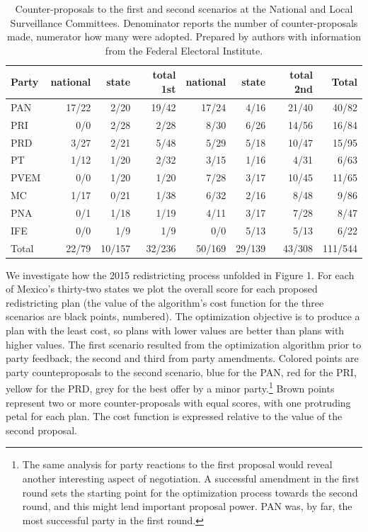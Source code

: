 \documentclass[letter,12pt]{article}
\begin{document}
\begin{table}
\begin{center}
  \begin{tabular}{lrrr|rrr|r}
    Party & national & state  & total 1st & national& state  & total 2nd & Total \\ \hline
    PAN   & 17/22    & 2/20   & 19/42     & 17/24   & 4/16   & 21/40     & 40/82 \\
    PRI   & 0/0      & 2/28   & 2/28      & 8/30    & 6/26   & 14/56     & 16/84 \\
    PRD   & 3/27     & 2/21   & 5/48      & 5/29    & 5/18   & 10/47     & 15/95 \\
    PT    & 1/12     & 1/20   & 2/32      & 3/15    & 1/16   & 4/31      & 6/63 \\
    PVEM  & 0/0      & 1/20   & 1/20      & 7/28    & 3/17   & 10/45     & 11/65 \\
    MC    & 1/17     & 0/21   & 1/38      & 6/32    & 2/16   & 8/48      & 9/86 \\
    PNA   & 0/1      & 1/18   & 1/19      & 4/11    & 3/17   & 7/28      & 8/47 \\
    IFE   & 0/0      & 1/9    & 1/9       & 0/0     & 5/13   & 5/13      & 6/22 \\ \hline
    Total & 22/79    & 10/157 & 32/236    & 50/169  & 29/139 & 43/308    & 111/544 \\
  \end{tabular}
  \caption{Counter-proposals to the first and second scenarios at the National and Local Surveillance Committees. Denominator reports the number of counter-proposals made, numerator how many were adopted. Prepared by authors with information from the Federal Electoral Institute.}\label{T:counterprops}
\end{center}
\end{table}

We investigate how the 2015 redistricting process unfolded in Figure 1. For each of Mexico's thirty-two states we plot the overall score for each proposed redistricting plan (the value of the algorithm's cost function for the three scenarios are black points, numbered). The optimization objective is to produce a plan with the least cost, so plans with lower values are better than plans with higher values. The first scenario resulted from the optimization algorithm prior to party feedback, the second and third from party amendments. Colored points are party counteproposals to the second scenario, blue for the PAN, red for the PRI, yellow for the PRD, grey for the best offer by a minor party.\footnote{The same analysis for party reactions to the first proposal would reveal another interesting aspect of negotiation. A successful amendment in the first round sets the starting point for the optimization process towards the second round, and this might lend important proposal power. PAN was, by far, the most successful party in the first round.} Brown points represent two or more counter-proposals with equal scores, with one protruding petal for each plan. The cost function is expressed relative to the value of the second proposal. 
\end{document}
